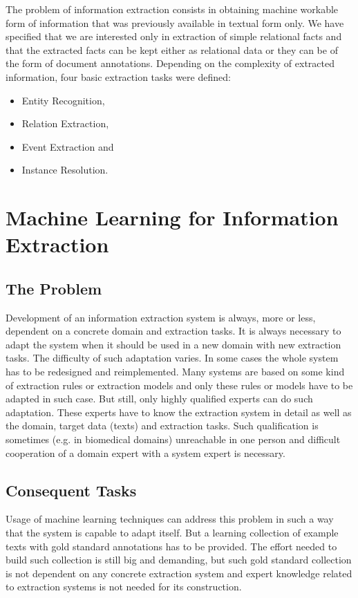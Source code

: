 The problem of information extraction consists in obtaining machine workable form of information that was previously available in textual form only. We have specified that we are interested only in extraction of simple relational facts and that the extracted facts can be kept either as relational data or they can be of the form of document annotations. Depending on the complexity of extracted information, four basic extraction tasks were defined:

\begin{itemize}
	\item Entity Recognition,
	\item Relation Extraction,
	\item Event Extraction and
	\item Instance Resolution.
\end{itemize}

\section{Machine Learning for Information Extraction}

\subsection{The Problem}

Development of an information extraction system is always, more or less, dependent on a concrete domain and extraction tasks. It is always necessary to adapt the system when it should be used in a new domain with new extraction tasks. The difficulty of such adaptation varies. In some cases the whole system has to be redesigned and reimplemented. Many systems are based on some kind of extraction rules or extraction models and only these rules or models have to be adapted in such case. But still, only highly qualified experts can do such adaptation. These experts have to know the extraction system in detail as well as the domain, target data (texts) and extraction tasks. Such qualification is sometimes (e.g. in biomedical domains) unreachable in one person and difficult cooperation of a domain expert with a system expert is necessary. 

\subsection{Consequent Tasks}

Usage of machine learning techniques can address this problem in such a way that the system is capable to adapt itself. But a learning collection of example texts with gold standard annotations has to be provided. The effort needed to build such collection is still big and demanding, but such gold standard collection is not dependent on any concrete extraction system and expert knowledge related to extraction systems is not needed for its construction. 

